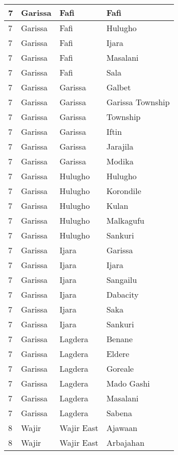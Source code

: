 \begin{table}[!ht]
\begin{tabular}{|l|l|l|l|}
        7 & Garissa & Fafi & Fafi \\ \hline
        7 & Garissa & Fafi & Hulugho \\ \hline
        7 & Garissa & Fafi & Ijara \\ \hline
        7 & Garissa & Fafi & Masalani \\ \hline
        7 & Garissa & Fafi & Sala \\ \hline
        7 & Garissa & Garissa & Galbet \\ \hline
        7 & Garissa & Garissa & Garissa Township \\ \hline
        7 & Garissa & Garissa & Township \\ \hline
        7 & Garissa & Garissa & Iftin \\ \hline
        7 & Garissa & Garissa & Jarajila \\ \hline
        7 & Garissa & Garissa & Modika \\ \hline
        7 & Garissa & Hulugho & Hulugho \\ \hline
        7 & Garissa & Hulugho & Korondile \\ \hline
        7 & Garissa & Hulugho & Kulan \\ \hline
        7 & Garissa & Hulugho & Malkagufu \\ \hline
        7 & Garissa & Hulugho & Sankuri \\ \hline
        7 & Garissa & Ijara & Garissa \\ \hline
        7 & Garissa & Ijara & Ijara \\ \hline
        7 & Garissa & Ijara & Sangailu \\ \hline
        7 & Garissa & Ijara & Dabacity \\ \hline
        7 & Garissa & Ijara & Saka \\ \hline
        7 & Garissa & Ijara & Sankuri \\ \hline
        7 & Garissa & Lagdera & Benane \\ \hline
        7 & Garissa & Lagdera & Eldere \\ \hline
        7 & Garissa & Lagdera & Goreale \\ \hline
        7 & Garissa & Lagdera & Mado Gashi \\ \hline
        7 & Garissa & Lagdera & Masalani \\ \hline
        7 & Garissa & Lagdera & Sabena \\ \hline
        8 & Wajir & Wajir East & Ajawaan \\ \hline
        8 & Wajir & Wajir East & Arbajahan \\ \hline

\end{tabular}
\end{table}
